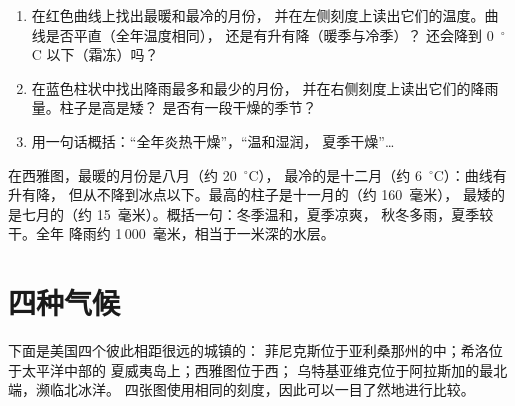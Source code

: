 \begin{method}[读懂气候图]\label{met:g5:weather-and-climate:reading}
\begin{enumerate}
  \item 在红色曲线上找出最暖和最冷的月份，
        并在左侧刻度上读出它们的温度。曲线是否平直（全年温度相同），
        还是有升有降（暖季与冷季）？
        还会降到 0~$^\circ$C 以下（霜冻）吗？
  \item 在蓝色柱状中找出降雨最多和最少的月份，
        并在右侧刻度上读出它们的降雨量。柱子是高是矮？
        是否有一段干燥的季节？
  \item 用一句话概括：“全年炎热干燥”，“温和湿润，
        夏季干燥”{\ldots}
\end{enumerate}
\end{method}

\begin{example}[西雅图]\label{ex:g5:weather-and-climate:seattle}
在西雅图，最暖的月份是八月（约 20~$^\circ$C），
最冷的是十二月（约 6~$^\circ$C）：曲线有升有降，
但从不降到冰点以下。最高的柱子是十一月的（约 160~毫米），
最矮的是七月的（约 15~毫米）。概括一句：冬季温和，夏季凉爽，
秋冬多雨，夏季较干。全年
降雨约 1\,000~毫米，相当于一米深的水层。
\end{example}

\section{四种气候}

下面是美国四个彼此相距很远的城镇的：
菲尼克斯位于亚利桑那州的中；希洛位于太平洋中部的
夏威夷岛上；西雅图位于西；
乌特基亚维克位于阿拉斯加的最北端，濒临北冰洋。
四张图使用相同的刻度，因此可以一目了然地进行比较。

